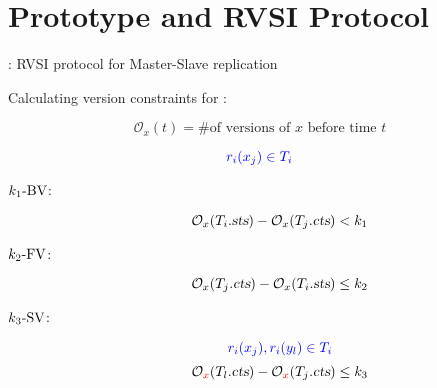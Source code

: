 \section{\chameleon{} Prototype and RVSI Protocol}



\begin{frame}{}
  \centerline{\rvsims{}: RVSI protocol for Master-Slave replication}

  \vspace{-0.80cm}
  \begin{center}
    \resizebox{0.50\textwidth}{!}{}
  \end{center}

\end{frame}

\begin{frame}{}
  Calculating version constraints for \rvsi{}: 

  \[
    \mathcal{O}_{x}(t) = \text{\# of versions of } x \text{ before time } t %
  \]

  \[
    \textcolor{blue}{r_i(x_j) \in T_i}
  \]
  \vspace{-0.40cm}
  \begin{description}
    \item[$k_1\text{-BV}$:]
      \[
	\mathcal{O}_{x}(T_i.\textsl{sts}) - \mathcal{O}_{x}(T_j.\textsl{cts}) < k_1
      \]
    \item[$k_2\text{-FV}$:]
      \[
	\mathcal{O}_{x}(T_j.\textsl{cts}) - \mathcal{O}_{x}(T_i.\textsl{sts}) \le k_2
      \]
    \pause
    \item[$k_3\text{-SV}$:]
      \[
	\textcolor{blue}{r_i(x_j), r_i(y_l) \in T_i}
      \]
      \vspace{-0.40cm}
      \[
	\mathcal{O}_{\textcolor{red}{x}}(T_l.\textsl{cts}) - \mathcal{O}_{\textcolor{red}{x}}(T_j.\textsl{cts}) \le k_3
      \]
  \end{description}
\end{frame}

